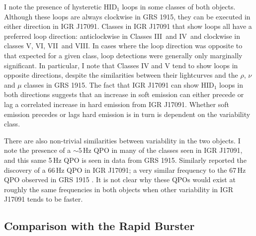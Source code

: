 \par I note the presence of hysteretic HID$_1$ loops in some classes of both objects.  Although these loops are always clockwise in GRS 1915, they can be executed in either direction in IGR J17091.  Classes in IGR J17091 that show loops all have a preferred loop direction: anticlockwise in Classes III\indexiii\ and IV\indexiv\ and clockwise in classes V\indexv, VI\indexvi, VII\indexvii\ and VIII\indexviii.  In cases where the loop direction was opposite to that expected for a given class, loop detections were generally only marginally significant.  In particular, I note that Classes IV and V tend to show loops in opposite directions, despite the similarities between their lightcurves and the $\rho$, $\nu$ and $\mu$ classes in GRS 1915.   The fact that IGR J17091 can show HID$_1$ loops in both directions suggests that an increase in soft emission can either precede or lag a correlated increase in hard emission from IGR J17091.  Whether soft emission precedes or lags hard emission is in turn is dependent on the variability class.
\par There are also non-trivial similarities between variability in the two objects.  I note the presence of a $\sim5$\,Hz QPO in many of the classes seen in IGR J17091, and this same 5\,Hz QPO is seen in data from GRS 1915.  Similarly \citet{Altamirano_HFQPO} reported the discovery of a 66\,Hz QPO in IGR J17091; a very similar frequency to the 67\,Hz QPO observed in GRS 1915 \citep{Morgan_QPO}.  It is not clear why these QPOs would exist at roughly the same frequencies in both objects when other variability in IGR J17091 tends to be faster.

\subsection{Comparison with the Rapid Burster}

